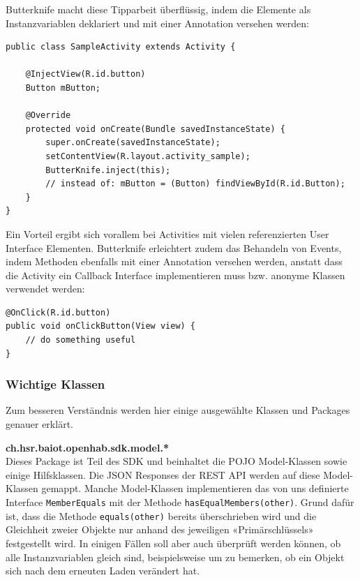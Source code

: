 Butterknife macht diese Tipparbeit überflüssig, indem die Elemente als Instanzvariablen deklariert und mit einer Annotation versehen werden:

\begin{lstlisting}[style=csharp, label=lst:butterknifeSample1, caption=Butterknife Beispiel 1]
public class SampleActivity extends Activity {

	@InjectView(R.id.button)
	Button mButton;
	
	@Override
	protected void onCreate(Bundle savedInstanceState) {
		super.onCreate(savedInstanceState);
		setContentView(R.layout.activity_sample);
		ButterKnife.inject(this);
		// instead of: mButton = (Button) findViewById(R.id.Button);
	}
}
\end{lstlisting}

Ein Vorteil ergibt sich vorallem bei Activities mit vielen referenzierten User Interface Elementen. Butterknife erleichtert zudem das Behandeln von Events, indem Methoden ebenfalls mit einer Annotation versehen werden, anstatt dass die Activity ein Callback Interface implementieren muss bzw. anonyme Klassen verwendet werden:

\begin{lstlisting}[style=csharp, label=lst:butterknifeSample2, caption=Butterknife Beispiel 2]
@OnClick(R.id.button)
public void onClickButton(View view) {
	// do something useful
}
\end{lstlisting}



\subsubsection{Wichtige Klassen}
\label{sec:importantClasses}
Zum besseren Verständnis werden hier einige ausgewählte Klassen und Packages genauer erklärt.

\textbf{ch.hsr.baiot.openhab.sdk.model.*}\\
Dieses Package ist Teil des SDK und beinhaltet die POJO Model-Klassen sowie einige Hilfsklassen. Die JSON Responses der REST API werden auf diese Model-Klassen gemappt. Manche Model-Klassen implementieren das von uns definierte Interface \lstinline!MemberEquals! mit der Methode \lstinline!hasEqualMembers(other)!. Grund dafür ist, dass die Methode \lstinline!equals(other)! bereits überschrieben wird und die Gleichheit zweier Objekte nur anhand des jeweiligen «Primärschlüssels» festgestellt wird. In einigen Fällen soll aber auch überprüft werden können, ob alle Instanzvariablen gleich sind, beispielsweise um zu bemerken, ob ein Objekt sich nach dem erneuten Laden verändert hat.

